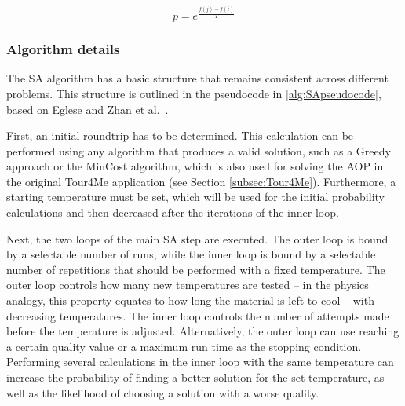 \begin{equation}\label{eq:SAprobCalculation}
	p = e^{\frac{f(j)-f(i)}{T}}
\end{equation}



\subsubsection{Algorithm details}
\label{subsubsec:SAPseudocode}

The SA algorithm has a basic structure that remains consistent across different problems.
This structure is outlined in the pseudocode in \ref{alg:SApseudocode}, based on Eglese \cite{eglese_simulated_1990} and Zhan et al.\ \cite{zhan_list-based_2016}. %

First, an initial roundtrip has to be determined. 
This calculation can be performed using any algorithm that produces a valid solution, such as a Greedy approach or the MinCost algorithm, which is also used for solving the AOP in the original Tour4Me application (see Section \ref{subsec:Tour4Me}).
Furthermore, a starting temperature must be set, which will be used for the initial probability calculations and then decreased after the iterations of the inner loop.

Next, the two loops of the main SA step are executed.
The outer loop is bound by a selectable number of runs, while the inner loop is bound by a selectable number of repetitions that should be performed with a fixed temperature.
The outer loop controls how many new temperatures are tested -- in the physics analogy, this property equates to how long the material is left to cool -- with decreasing temperatures.
The inner loop controls the number of attempts made before the temperature is adjusted. 
Alternatively, the outer loop can use reaching a certain quality value or a maximum run time as the stopping condition.
Performing several calculations in the inner loop with the same temperature can increase the probability of finding a better solution for the set temperature, as well as the likelihood of choosing a solution with a worse quality.







